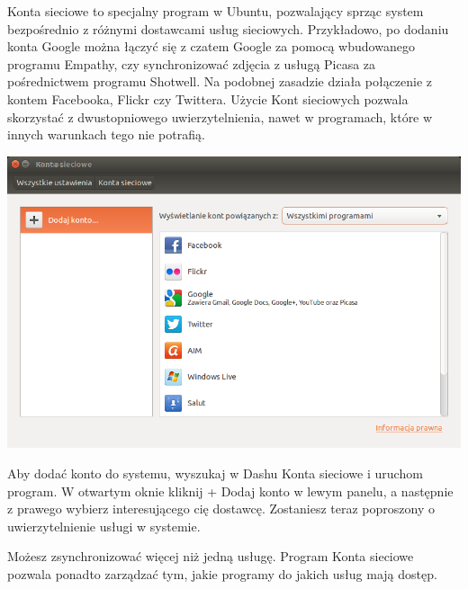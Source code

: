 \textcolor{ubuntu_orange}{Konta sieciowe} to specjalny program w Ubuntu, pozwalający sprząc system bezpośrednio z różnymi dostawcami usług sieciowych. Przykładowo, po dodaniu konta Google można łączyć się z czatem Google za pomocą wbudowanego programu Empathy, czy synchronizować zdjęcia z usługą Picasa za pośrednictwem programu Shotwell. Na podobnej zasadzie działa połączenie z kontem Facebooka, Flickr czy Twittera. Użycie \textcolor{ubuntu_orange}{Kont sieciowych} pozwala skorzystać z dwustopniowego uwierzytelnienia, nawet w programach, które w innych warunkach tego nie potrafią.

\begin{center}
	\includegraphics[width=\linewidth]{images/programy_kontaOnline1.png}
\end{center}

Aby dodać konto do systemu, wyszukaj w Dashu \textcolor{ubuntu_orange}{Konta sieciowe} i uruchom program. W otwartym oknie kliknij \textcolor{ubuntu_orange}{+ Dodaj konto} w lewym panelu, a następnie z prawego wybierz interesującego cię dostawcę. Zostaniesz teraz poproszony o uwierzytelnienie usługi w systemie.

Możesz zsynchronizować więcej niż jedną usługę. Program \textcolor{ubuntu_orange}{Konta sieciowe} pozwala ponadto zarządzać tym, jakie programy do jakich usług mają dostęp. 
